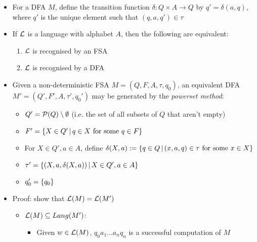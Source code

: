 \begin{itemize}
	
	\item For a DFA $ M $, define the transition function $ \delta: Q \times A \to Q $ by $ q' = \delta(a, q) $, where $ q' $ is the unique element such that $ (q, a, q') \in \tau $
	
	\item If $ \mathcal{L} $ is a language with alphabet $ A $, then the following are equivalent:
	
	\begin{enumerate}
		\item $ \mathcal{L} $ is recognised by an FSA
		
		\item $ \mathcal{L} $ is recognised by a DFA
	\end{enumerate}
	
	\item Given a non-deterministic FSA $ M = (Q, F, A, \tau, q_0) $, an equivalent DFA $ M' = (Q', F', A, \tau', q_0') $ may be generated by the \textit{powerset method}:
	
	\begin{itemize}
		
		\item $ Q' = \mathcal{P}(Q) \setminus \emptyset $ (i.e. the set of all subsets of $ Q $ that aren't empty)
		
		\item $ F' = \left\lbrace X \in Q' \, | \, q \in X \text{ for some } q \in F \right\rbrace $
		
		\item For $ X \in Q', a \in A $, define $ \delta(X, a) := \left\lbrace q \in Q \, | \, (x, a, q) \in \tau \text{ for some } x \in X \right\rbrace $
		
		\item $ \tau' = \left\lbrace (X, a, \delta(X, a)) \, | \, X \in Q', a \in A \right\rbrace $
		
		\item $ q_0' = \left\lbrace q_0 \right\rbrace $
		
	\end{itemize}

	\item Proof: show that $ \mathcal{L}(M) = \mathcal{L}(M') $
	
	\begin{itemize}
		\item $ \mathcal{L}(M) \subseteq Lang(M') $:
		
		\begin{itemize}
			\item Given $ w \in \mathcal{L}(M) $, $  q_0 a_1 \dots a_n q_n $ is a successful computation of $ M $
			

\end{itemize}
\end{itemize}
\end{itemize}
